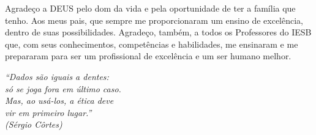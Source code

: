 \documentclass[
	12pt,				%
	a4paper,			%
    openany,            %
    oneside,            %
	english,			%
	spanish,			%
	brazil,				%
	]{abntex2}          %
\begin{document}
\begin{agradecimentos}
Agradeço a DEUS pelo dom da vida e pela oportunidade de ter a família que tenho. Aos meus pais, que sempre me proporcionaram um ensino de excelência, dentro de suas possibilidades. Agradeço, também, a todos os Professores do IESB que, com seus conhecimentos, competências e habilidades, me ensinaram e me prepararam para ser um profissional de excelência e um ser humano melhor.
\end{agradecimentos}

\begin{epigrafe}
    \vspace*{\fill}
	\begin{flushright}
		\textit{``Dados são iguais a dentes: \\
		só se joga fora em último caso. \\
        Mas, ao usá-los, a ética deve \\
        vir em primeiro lugar.''\\
		(Sérgio Côrtes)}
	\end{flushright}
\end{epigrafe}







\clearpage

\listoffigures*
\cleardoublepage


\listoftables*
\cleardoublepage


\end{document}
